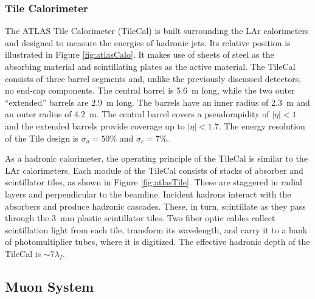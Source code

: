 \subsubsection{Tile Calorimeter}

The ATLAS Tile Calorimeter (TileCal) is built surrounding the LAr calorimeters and designed to measure the energies of hadronic jets.
Its relative position is illustrated in Figure \ref{fig:atlasCalo}.
It makes use of sheets of steel as the absorbing material and scintillating plates as the active material.
The TileCal consists of three barrel segments and, unlike the previously discussed detectors, no end-cap components.
The central barrel is 5.6~m long, while the two outer ``extended'' barrels are 2.9~m long.
The barrels have an inner radius of 2.3~m and an outer radius of 4.2~m.
The central barrel covers a pseudorapidity of $|\eta|<1$ and the extended barrels provide coverage up to $|\eta|<1.7$.
The energy resolution of the Tile design is $\sigma_a=50\%$ and $\sigma_c=7\%$.
\cite{tileTdr}

As a hadronic calorimeter, the operating principle of the TileCal is similar to the LAr calorimeters.
Each module of the TileCal consists of stacks of absorber and scintillator tiles, as shown in Figure \ref{fig:atlasTile}.
These are staggered in radial layers and perpendicular to the beamline.
Incident hadrons interact with the absorbers and produce hadronic cascades.
These, in turn, scintillate as they pass through the 3~mm plastic scintillator tiles.
Two fiber optic cables collect scintillation light from each tile, transform its wavelength, and carry it to a bank of photomultiplier tubes, where it is digitized.
The effective hadronic depth of the TileCal is $\sim7\lambda_I$.
\cite{tile}

\subsection{Muon System}


